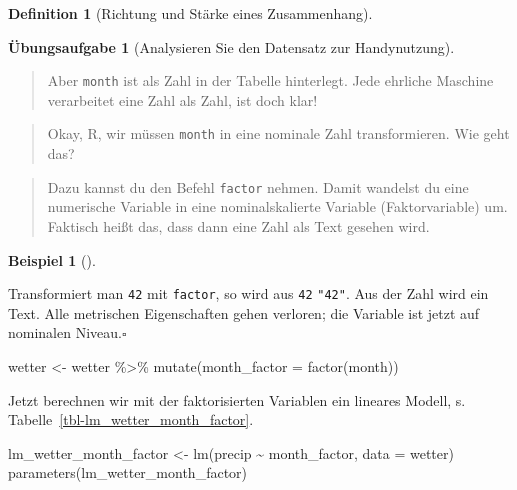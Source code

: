 \documentclass[
  a4paper,
  DIV=11]{scrreprt}
\newenvironment{Shaded}{\begin{snugshade}}{\end{snugshade}}
\newcommand{\AttributeTok}[1]{\textcolor[rgb]{0.40,0.45,0.13}{#1}}
\newcommand{\FunctionTok}[1]{\textcolor[rgb]{0.28,0.35,0.67}{#1}}
\newcommand{\NormalTok}[1]{\textcolor[rgb]{0.00,0.23,0.31}{#1}}
\newcommand{\OtherTok}[1]{\textcolor[rgb]{0.00,0.23,0.31}{#1}}
\newcommand{\SpecialCharTok}[1]{\textcolor[rgb]{0.37,0.37,0.37}{#1}}
\theoremstyle{definition}
\newtheorem{exercise}{Übungsaufgabe}[chapter]
\theoremstyle{definition}
\newtheorem{example}{Beispiel}[chapter]
\theoremstyle{definition}
\newtheorem{definition}{Definition}[chapter]
\theoremstyle{remark}
\begin{document}
\begin{definition}[Richtung und Stärke eines
Zusammenhang]
\begin{exercise}[Analysieren Sie den Datensatz zur
Handynutzung]
\begin{quote}
{} Aber \texttt{month} ist als Zahl in der Tabelle
hinterlegt. Jede ehrliche Maschine verarbeitet eine Zahl als Zahl, ist
doch klar!
\end{quote}

\begin{quote}
{} Okay, R, wir müssen \texttt{month} in eine nominale Zahl
transformieren. Wie geht das?
\end{quote}

\begin{quote}
{} Dazu kannst du den Befehl \texttt{factor} nehmen. Damit
wandelst du eine numerische Variable in eine nominalskalierte Variable
(Faktorvariable) um. Faktisch heißt das, dass dann eine Zahl als Text
gesehen wird.
\end{quote}

\begin{example}[]\protect\hypertarget{exm-factor}{}\label{exm-factor}

Transformiert man \texttt{42} mit \texttt{factor}, so wird aus
\texttt{42} \texttt{"42"}. Aus der Zahl wird ein Text. Alle metrischen
Eigenschaften gehen verloren; die Variable ist jetzt auf nominalen
Niveau.\(\square\)

\end{example}

\begin{Shaded}
\begin{Highlighting}[]
\NormalTok{wetter }\OtherTok{\textless{}{-}}
\NormalTok{  wetter }\SpecialCharTok{\%\textgreater{}\%} 
  \FunctionTok{mutate}\NormalTok{(}\AttributeTok{month\_factor =} \FunctionTok{factor}\NormalTok{(month))}
\end{Highlighting}
\end{Shaded}

Jetzt berechnen wir mit der faktorisierten Variablen ein lineares
Modell, s. Tabelle~\ref{tbl-lm_wetter_month_factor}.

\begin{Shaded}
\begin{Highlighting}[]
\NormalTok{lm\_wetter\_month\_factor }\OtherTok{\textless{}{-}} \FunctionTok{lm}\NormalTok{(precip }\SpecialCharTok{\textasciitilde{}}\NormalTok{ month\_factor, }\AttributeTok{data =}\NormalTok{ wetter)}
\FunctionTok{parameters}\NormalTok{(lm\_wetter\_month\_factor)}
\end{Highlighting}
\end{Shaded}


\end{exercise}
\end{definition}
\end{document}
